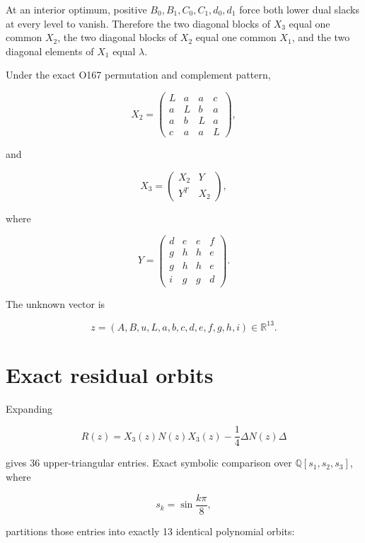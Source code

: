\documentclass[11pt,a4paper,openany]{report}
\begin{document}
At an interior optimum, positive \(B_0,B_1,C_0,C_1,d_0,d_1\) force both lower dual slacks at every level to vanish. Therefore the two diagonal blocks of \(X_3\) equal one common \(X_2\), the two diagonal blocks of \(X_2\) equal one common \(X_1\), and the two diagonal elements of \(X_1\) equal \(\lambda\).

Under the exact O167 permutation and complement pattern,

\[
X_2=
\begin{pmatrix}
L&a&a&c\\
a&L&b&a\\
a&b&L&a\\
c&a&a&L
\end{pmatrix},
\]

and

\[
X_3=
\begin{pmatrix}
X_2&Y\\
Y^{T}&X_2
\end{pmatrix},
\]

where

\[
Y=
\begin{pmatrix}
d&e&e&f\\
g&h&h&e\\
g&h&h&e\\
i&g&g&d
\end{pmatrix}.
\]

The unknown vector is

\[
z=(A,B,u,L,a,b,c,d,e,f,g,h,i)\in\mathbb R^{13}.
\]

\section{Exact residual orbits}

Expanding

\[
R(z)=X_3(z)N(z)X_3(z)
-\frac14\Delta N(z)\Delta
\]

gives 36 upper-triangular entries. Exact symbolic comparison over \(\mathbb Q[s_1,s_2,s_3]\), where

\[
s_k=\sin\frac{k\pi}{8},
\]

partitions those entries into exactly 13 identical polynomial orbits:
\end{document}

